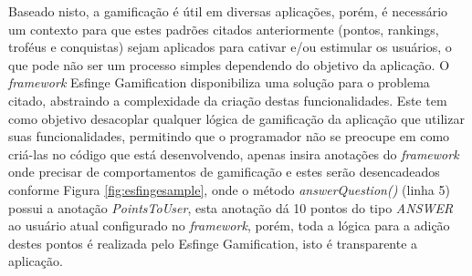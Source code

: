 

\par Baseado nisto, a gamificação é útil em diversas aplicações, porém, é necessário um contexto para que estes padrões citados anteriormente (pontos, rankings, troféus e conquistas) sejam aplicados para cativar e/ou estimular os usuários, o que pode não ser um processo simples dependendo do objetivo da aplicação. O \textit{framework} Esfinge Gamification disponibiliza uma solução para o problema citado, abstraindo a complexidade da criação destas funcionalidades. Este tem como objetivo desacoplar qualquer lógica de gamificação da aplicação que utilizar suas funcionalidades, permitindo que o programador não se preocupe em como criá-las no código que está desenvolvendo, apenas insira anotações do \textit{framework} onde precisar de comportamentos de gamificação  e estes serão desencadeados conforme Figura \ref{fig:esfingesample}, onde o método \textit{answerQuestion()} (linha 5) possui a anotação \textit{PointsToUser}, esta anotação dá 10 pontos do tipo \textit{ANSWER} ao usuário atual configurado no \textit{framework}, porém, toda a lógica para a adição destes pontos é realizada pelo Esfinge Gamification, isto é transparente a aplicação.

